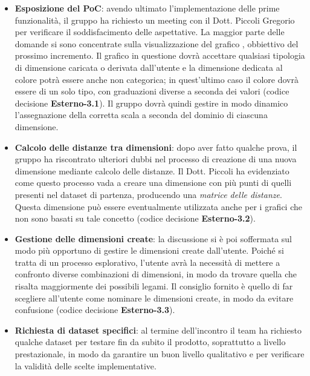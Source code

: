 \begin{itemize}

\item \textbf{Esposizione del PoC}: avendo ultimato l'implementazione delle prime funzionalità, il gruppo ha richiesto un meeting con il Dott. Piccoli Gregorio per verificare il soddisfacimento delle aspettative. La maggior parte delle domande si sono concentrate sulla visualizzazione del grafico \textit{}, obbiettivo del prossimo incremento. Il grafico in questione dovrà accettare qualsiasi tipologia di dimensione caricata o derivata dall'utente e la dimensione dedicata al colore potrà essere anche non categorica; in quest'ultimo caso il colore dovrà essere di un solo tipo, con graduazioni diverse a seconda dei valori (codice decisione \textbf{Esterno-3.1}). Il gruppo dovrà quindi gestire in modo dinamico l'assegnazione della corretta scala a seconda del dominio di ciascuna dimensione.

\item \textbf{Calcolo delle distanze tra dimensioni}: dopo aver fatto qualche prova, il gruppo ha riscontrato ulteriori dubbi nel processo di creazione di una nuova dimensione mediante calcolo delle distanze. Il Dott. Piccoli ha evidenziato come questo processo vada a creare una dimensione con più punti di quelli presenti nel dataset di partenza, producendo una \textit{matrice delle distanze}. Questa dimensione può essere eventualmente utilizzata anche per i grafici che non sono basati su tale concetto (codice decisione \textbf{Esterno-3.2}).

\item \textbf{Gestione delle dimensioni create}: la discussione si è poi soffermata sul modo più opportuno di gestire le dimensioni create dall'utente. Poiché si tratta di un processo esplorativo, l'utente avrà la necessità di mettere a confronto diverse combinazioni di dimensioni, in modo da trovare quella che risalta maggiormente dei possibili legami. Il consiglio fornito è quello di far scegliere all'utente come nominare le dimensioni create, in modo da evitare confusione (codice decisione \textbf{Esterno-3.3}).

\item \textbf{Richiesta di dataset specifici}: al termine dell'incontro il team ha richiesto qualche dataset per testare fin da subito il prodotto, soprattutto a livello prestazionale, in modo da garantire un buon livello qualitativo e per verificare la validità delle scelte implementative.  

\end{itemize}